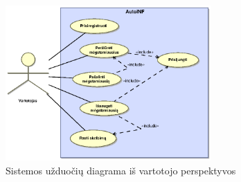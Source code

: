\documentclass[12pt]{article}
\begin{document}
	\begin{figure}[h]
		\begin{center}
			\includegraphics[width=0.7\textwidth]{TikslaiVartotojas.eps}
			\caption{Sistemos užduočių diagrama iš vartotojo perspektyvos\label{UseCaseUser}}
		\end{center}
	\end{figure}
	\pagebreak
	
\end{document}
